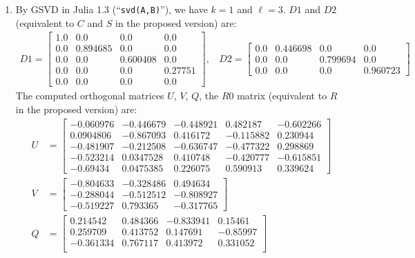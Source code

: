 \begin{example}
{\begin{enumerate}[(1).]
\item 
By GSVD in Julia 1.3 (``{\tt svd(A,B)}''), we have $k = 1$ and $\ell = 3$. 
$D1$ and $D2$ (equivalent to $C$ and $S$ in the proposed version) are:
\begin{align*}
     D1 = \begin{bmatrix}
      1.0 & 0.0 & 0.0 & 0.0 \\
      0.0 & 0.894685 & 0.0 & 0.0 \\
      0.0 & 0.0 & 0.600408 & 0.0 \\   
      0.0 & 0.0 & 0.0 & 0.27751 \\
      0.0 & 0.0 & 0.0 & 0.0
    \end{bmatrix} , \ \ \ \
     D2 = \begin{bmatrix}
      0.0 & 0.446698 & 0.0 & 0.0 \\     
      0.0 & 0.0 & 0.799694 & 0.0 \\  
      0.0 & 0.0 & 0.0 & 0.960723
    \end{bmatrix}
\end{align*}
The computed orthogonal matrices $U$, $V$, $Q$, the $R0$ matrix (equivalent to $R$ in the proposed version) are: 
\begin{align*}
    U &= \begin{bmatrix}
      -0.060976 &  -0.446679  & -0.448921 &  0.482187 & -0.602266 \\
       0.0904806 & -0.867093  &  0.416172 & -0.115882 &  0.230944 \\
      -0.481907 &  -0.212508  & -0.636747 & -0.477322 &  0.298869 \\
      -0.523214  &  0.0347528 &  0.410748 & -0.420777 & -0.615851 \\
      -0.69434  &   0.0475385 &  0.226075 &  0.590913 &  0.339624
    \end{bmatrix} \\ 
    V &= \begin{bmatrix}
      -0.804633 & -0.328486 & 0.494634 \\
      -0.288044 & -0.512512 & -0.808927 \\
      -0.519227 &  0.793365 & -0.317765
    \end{bmatrix} \\ 
    Q &= \begin{bmatrix}
       0.214542 & 0.484366 & -0.833941 &  0.15461 \\ 
       0.259709 &  0.413752 & 0.147691 & -0.85997 \\
      -0.361334 &  0.767117 &   0.413972 & 0.331052 \\

\end{bmatrix}
\end{align*}
\end{enumerate}}
\end{example}
